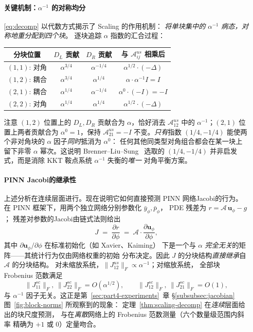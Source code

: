 \documentclass{xmu}
\theoremstyle{plain}
\theoremstyle{remark}
\begin{document}
\paragraph{关键机制：$\alpha^{-1}$ 的对称均分}
\eqref{eq:decomp} 以代数方式揭示了 Scaling 的作用机制：
\emph{将单块集中的 $\alpha^{-1}$ 病态，对称地重分配到四个块}。
逐块追踪 $\alpha$ 指数的汇合过程：

\begin{center}
\begin{tabular}{c|c|c|c}
\toprule
分块位置 & $D_L$ 贡献 & $D_R$ 贡献 & 与 $\mathcal{A}^{us}_{ij}$ 相乘后 \\
\midrule
$(1,1)$: 对角 & $\alpha^{3/4}$ & $\alpha^{-1/4}$ & $\alpha^{1/2}\cdot(-\Delta)$ \\[1pt]
$(1,2)$: 耦合 & $\alpha^{3/4}$ & $\alpha^{1/4}$ & $\alpha\cdot\alpha^{-1}I = I$ \\[1pt]
$(2,1)$: 耦合 & $\alpha^{1/4}$ & $\alpha^{-1/4}$ & $\alpha^{0}\cdot(-I) = -I$ \\[1pt]
$(2,2)$: 对角 & $\alpha^{1/4}$ & $\alpha^{1/4}$ & $\alpha^{1/2}\cdot(-\Delta)$ \\
\bottomrule
\end{tabular}
\end{center}

注意 $(1,2)$ 位置上的 $D_L, D_R$ 贡献合为 $\alpha$，恰好消去
$\mathcal{A}^{us}_{12}$ 中的 $\alpha^{-1}$；$(2,1)$ 位置上两者贡献合为
$\alpha^{0}=1$，保持 $\mathcal{A}^{us}_{21}=-I$ 不变。\emph{只有}指数
$(1/4,-1/4)$ 能使两个非对角块的 $\alpha$ 因子\emph{同时}抵消为 $\alpha^{0}$：
任何其他同类型对角组合都会在某一块上留下非零 $\alpha$ 幂次。这说明
Brenner--Liu--Sung~\cite{4} 选取的 $(1/4,-1/4)$ 并非启发式，而是消除
KKT 鞍点系统 $\alpha^{-1}$ 失衡的\emph{唯一}
对角平衡方案。

\paragraph{PINN Jacobi的继承性}
上述分析在连续层面进行。现在说明它如何直接预测 PINN 网络Jacobi的行为。
在 PINN 框架下，用两个独立网络分别参数化 $\bar y_\phi,\bar p_\phi$，
PDE 残差为 $r = \mathcal{A}\,\mathbf{u}_\phi - g$；
残差对参数的Jacobi由链式法则给出
\begin{equation}
J \;=\; \frac{\partial r}{\partial\phi}
\;=\; \mathcal{A}\cdot \frac{\partial \mathbf{u}_\phi}{\partial\phi},
\label{eq:jacobian-chain}
\end{equation}
其中 $\partial\mathbf{u}_\phi/\partial\phi$ 在标准初始化（如 Xavier、Kaiming）
下是一个与 $\alpha$ \emph{完全无关}的矩阵——其统计行为仅由网络权重的初始
分布决定。因此 $J$ 的分块结构\emph{直接继承}自 $\mathcal{A}$ 的分块结构。
对未缩放系统，$\|J_{12}^{us}\|_F\propto\alpha^{-1}$；对缩放系统，
全部块 Frobenius 范数满足
\[
  \|J_{11}^{sc}\|_F,\ \|J_{22}^{sc}\|_F = O(\alpha^{1/2}),
  \qquad
  \|J_{12}^{sc}\|_F,\ \|J_{21}^{sc}\|_F = O(1),
\]
与 $\alpha^{-1}$ 因子无关。这正是第~\ref{sec:part4-experiments}~章
§\ref{subsubsec:jacobian} 图~\ref{fig:block-norms} 所观察到的现象：
定理~\ref{thm:scaling-decomp} 在\emph{连续}层面给出的块尺度预测，
与在\emph{离散}网络上的 Frobenius 范数测量（六个数量级范围内斜率
精确为 $+1$ 或 $0$）定量吻合。
\end{document}
